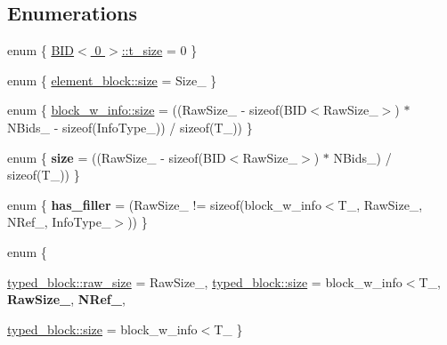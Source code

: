 \subsection*{Enumerations}
\begin{CompactItemize}
\item 
enum \{ \hyperlink{group__mnglayer_ggd7fa741aa0ccf5fb9b7b0085669864d3955b5433f4e53a6b37036545e6af766f}{BID$<$ 0 $>$::t\_\-size} =  0
 \}
\item 
enum \{ \hyperlink{group__mnglayer_gg2c6c9f26f6ba7bd45841bb125b90e04f5fdb4b66f1c64a4b69f23756713341f2}{element\_\-block::size} =  Size\_\-
 \}
\item 
enum \{ \hyperlink{group__mnglayer_gg64e9c147e936f85096c89f816d71695c79551ce6ebb37de68c336bcae6d9c201}{block\_\-w\_\-info::size} =  ((RawSize\_\- - sizeof(BID$<$RawSize\_\-$>$) $\ast$ NBids\_\- - sizeof(InfoType\_\-)) / sizeof(T\_\-))
 \}
\item 
enum \{ \textbf{size} =  ((RawSize\_\- - sizeof(BID$<$RawSize\_\-$>$) $\ast$ NBids\_\-) / sizeof(T\_\-))
 \}
\item 
enum \{ \textbf{has\_\-filler} =  (RawSize\_\- != sizeof(block\_\-w\_\-info$<$T\_\-, RawSize\_\-, NRef\_\-, InfoType\_\-$>$))
 \}
\item 
enum \{ \par
\hyperlink{group__mnglayer_gg43854e49708cf32d97e65d727593833c53f1c9c4e116e026d8096110c42f27ea}{typed\_\-block::raw\_\-size} =  RawSize\_\-, 
\hyperlink{group__mnglayer_gg43854e49708cf32d97e65d727593833c8e272a078e257c8700b765dc85bf53a2}{typed\_\-block::size} =  block\_\-w\_\-info$<$T\_\-, 
\textbf{RawSize\_\-}, 
\textbf{NRef\_\-}, 
\par
\hyperlink{group__mnglayer_gg43854e49708cf32d97e65d727593833c8e272a078e257c8700b765dc85bf53a2}{typed\_\-block::size} =  block\_\-w\_\-info$<$T\_\-
 \}
\end{CompactItemize}
